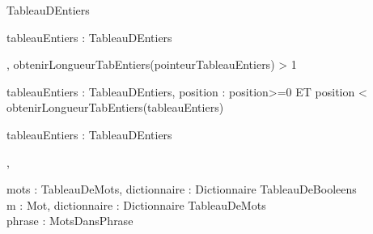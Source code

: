 \begin{algorithme}
		{}%
		{TableauDEntiers}
		
		{tableauEntiers : TableauDEntiers}%
		{\naturel}
		
		{, }%
		{obtenirLongueurTabEntiers(pointeurTableauEntiers) > 1}
		
		{tableauEntiers : TableauDEntiers, position : \naturel}%
		{\entier}%
		{position>=0 ET position < obtenirLongueurTabEntiers(tableauEntiers)}
	
		{tableauEntiers : TableauDEntiers}%
		{}
		
		{,}%
		{}
		
		{}%
		{}
		
		{}%
		{}

		{}%
		{}
	
		{}%
		{}
	
	
		{mots : TableauDeMots, dictionnaire : Dictionnaire}%
		{TableauDeBooleens}\\
		
		{m : Mot, dictionnaire : Dictionnaire}%
		{TableauDeMots}\\
		
		{phrase : \chaine}%
		{MotsDansPhrase}
\end{algorithme}
